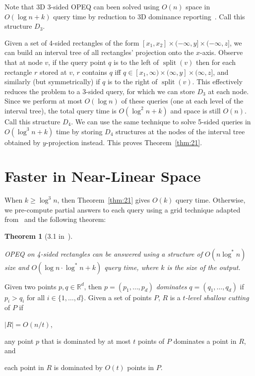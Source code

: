 \documentclass[letterpaper,12pt,twocolumn]{article}
\DeclareMathOperator{\splt}{split}
\newcommand{\BigOh}[1]{O\!\left(#1\right)}
\newcommand\IR{\mathbb{R}}
\newcommand\D[1]{$D_{#1}$}
\newcommand\bounds[1]{[#1]}
\newcommand\lbounds[1]{(#1]} %
\newcommand\rbounds[1]{[#1)} %
\theoremstyle{plain}
\newtheorem{theorem}{Theorem}
\begin{document}
Note that 3D 3-sided OPEQ can been solved using $\BigOh{n}$ space in
$\BigOh{\log n + k}$ query time by reduction to 3D dominance
reporting~\cite{afshani2008dominance,makris2012improved}.  Call this
structure \D{3}.

Given a set of 4-sided rectangles of the form $\bounds{x_1,x_2} \times
\lbounds{-\infty, y} \times \lbounds{-\infty,z}$, we can build an
interval tree of all rectangles' projection onto the $x$-axis.
Observe that at node $v$, if the query point $q$ is to the left of
$\splt(v)$ then for each rectangle $r$ stored at $v$, $r$ contains $q$
iff $q \in \rbounds{x_1, \infty} \times \lbounds{\infty, y} \times
\lbounds{\infty, z}$, and similarly (but symmetrically) if $q$ is to
the right of $\splt(v)$.  This effectively reduces the problem to a
3-sided query, for which we can store \D{3} at each node.  Since we
perform at most $\BigOh{\log n}$ of these queries (one at each level
of the interval tree), the total query time is $\BigOh{\log^2 n + k}$
and space is still $\BigOh{n}$.  Call this structure \D{4}.  We can
use the same technique to solve 5-sided queries in $\BigOh{\log^3 n +
  k}$ time by storing \D{4} structures at the nodes of the interval
tree obtained by $y$-projection instead.  This proves
Theorem~\ref{thm:21}.

\section{Faster in Near-Linear Space}

When $k \ge \log^3 n$, then Theorem~\ref{thm:21} gives $\BigOh{k}$
query time.  Otherwise, we pre-compute partial answers to each query
using a grid technique adapted from~\cite{alstrup2000new} and the
following theorem:

\begin{theorem}[3.1 in~\cite{saladi2015improved}]\label{thm:31}

  OPEQ on 4-sided rectangles can be answered using a structure of
  $\BigOh{n\log^* n}$ size and $\BigOh{\log n \cdot \log^* n + k}$
  query time, where $k$ is the size of the output.

\end{theorem}

Given two points $p,q \in \IR^d$, then $p = (p_1, \ldots, p_d)$
\emph{dominates} $q = (q_1, \ldots, q_d)$ if $p_i > q_i$ for all $i
\in \{1, \ldots, d \}$.  Given a set of points $P$, $R$ is a
\emph{$t$-level shallow cutting} of $P$ if
%
\begin{enumerate*}[label=(\roman*)]
\item $|R| = \BigOh{n/t}$,
\item any point $p$ that is dominated by at most $t$ points of $P$
  dominates a point in $R$, and
\item each point in $R$ is dominated by $\BigOh{t}$ points in $P$.
\end{enumerate*}
\end{document}
